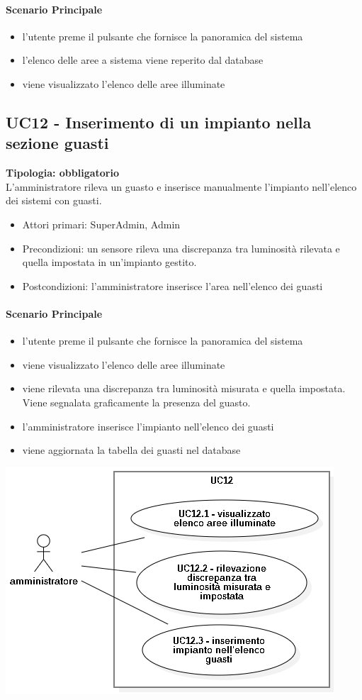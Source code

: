 \documentclass[12pt]{article}
\begin{document}
\paragraph{Scenario Principale}
\begin{itemize}
	\item l'utente preme il pulsante che fornisce la panoramica del sistema
	\item l'elenco delle aree a sistema viene reperito dal database
	\item viene visualizzato l'elenco delle aree illuminate
\end{itemize}


\subsection{UC12 - Inserimento di un impianto nella sezione guasti}
\textbf{Tipologia: obbligatorio} \\
L'amministratore rileva un guasto e inserisce manualmente l'impianto nell'elenco dei sistemi con guasti.
\begin{itemize}
	\item Attori primari: SuperAdmin, Admin
	\item Precondizioni: un sensore rileva una discrepanza tra luminosità rilevata e quella impostata in un'impianto gestito.
	\item Postcondizioni: l'amministratore inserisce l'area nell'elenco dei guasti
\end{itemize}
\paragraph{Scenario Principale}
\begin{itemize}
	\item l'utente preme il pulsante che fornisce la panoramica del sistema
	\item viene visualizzato l'elenco delle aree illuminate
	\item viene rilevata una discrepanza tra luminosità misurata e quella impostata. Viene segnalata graficamente la presenza del guasto.
	\item l'amministratore inserisce l'impianto nell'elenco dei guasti
	\item viene aggiornata la tabella dei guasti nel database
\end{itemize}

\includegraphics[scale=0.5]{UC12.png}
\end{document}
